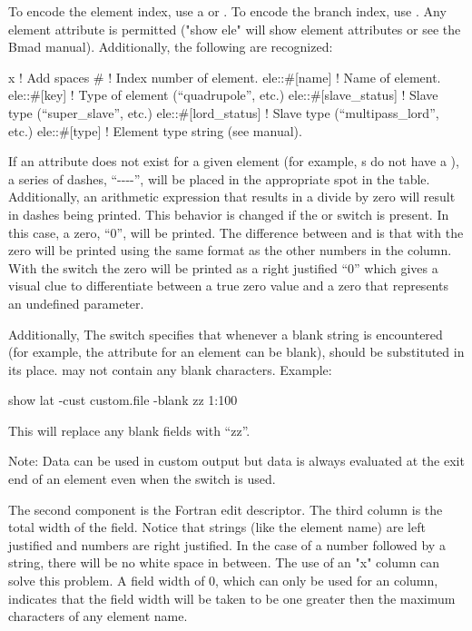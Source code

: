 {{{{{To encode the element index, use a \vn{\#} or . To encode the branch index, use
. Any element attribute is permitted ("show ele" will show element attributes or see
the Bmad manual). Additionally, the following are recognized:
\begin{example}
  x                           ! Add spaces
  #                           ! Index number of element.
  ele::#[name]                ! Name of element.
  ele::#[key]                 ! Type of element (``quadrupole'', etc.)
  ele::#[slave_status]        ! Slave type (``super_slave'', etc.)
  ele::#[lord_status]         ! Slave type (``multipass_lord'', etc.)
  ele::#[type]                ! Element type string (see \bmad manual).
\end{example}
If an attribute does not exist for a given element (for example, s do not have a
), a series of dashes, ``-{}-{}-{}-'', will be placed in the appropriate spot in the
table.  Additionally, an arithmetic expression that results in a divide by zero will result in
dashes being printed. This behavior is changed if the  or  switch is
present. In this case, a zero, ``0'', will be printed. The difference between  and
 is that with  the zero will be printed using the same format as the other
numbers in the column. With the  switch the zero will be printed as a right
justified  ``0'' which gives a visual clue to differentiate between a true zero value and a zero
that represents an undefined parameter.

Additionally, The  switch specifies that whenever a blank
string is encountered (for example, the  attribute for an element can be blank),
 should be substituted in its place.  may not contain any blank
characters. Example:
\begin{example}
  show lat -cust custom.file -blank zz 1:100
\end{example}
This will replace any blank fields with ``zz''.

Note: Data can be used in custom output but data is always evaluated at the exit end of an
element even when the  switch is used.

The second component is the Fortran edit descriptor. The third column is the total width
of the field. Notice that strings (like the element name) are left justified and numbers
are right justified. In the case of a number followed by a string, there will be no white
space in between. The use of an "x" column can solve this problem. A field width of 0,
which can only be used for an  column, indicates that the field width
will be taken to be one greater then the maximum characters of any element name.

}}}}}

